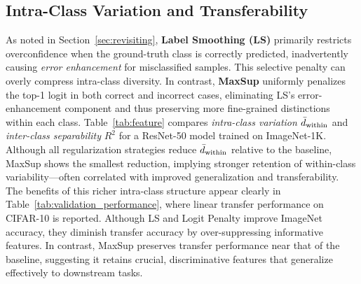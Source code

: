 \subsection{Intra-Class Variation and Transferability}
As noted in Section~\ref{sec:revisiting}, \textbf{Label Smoothing (LS)} primarily restricts overconfidence when the ground-truth class is correctly predicted, inadvertently causing \emph{error enhancement} for misclassified samples. This selective penalty can overly compress intra-class diversity. In contrast, \textbf{MaxSup} uniformly penalizes the top-1 logit in both correct and incorrect cases, eliminating LS’s error-enhancement component and thus preserving more fine-grained distinctions within each class.
Table~\ref{tab:feature} compares \emph{intra-class variation} $\Bar{d}_{\text{within}}$ and \emph{inter-class separability} $R^2$ \citep{kornblith2021better} for a ResNet-50 model trained on ImageNet-1K. Although all regularization strategies reduce $\Bar{d}_{\text{within}}$ relative to the baseline, MaxSup shows the smallest reduction, implying stronger retention of within-class variability—often correlated with improved generalization and transferability.
The benefits of this richer intra-class structure appear clearly in Table~\ref{tab:validation_performance}, where linear transfer performance on CIFAR-10 is reported. Although LS and Logit Penalty improve ImageNet accuracy, they diminish transfer accuracy by over-suppressing informative features. In contrast, MaxSup preserves transfer performance near that of the baseline, suggesting it retains crucial, discriminative features that generalize effectively to downstream tasks.


